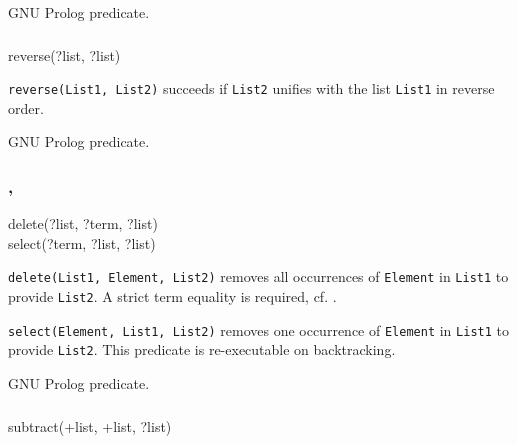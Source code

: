 \PlErrorsNone

\Portability

GNU Prolog predicate.

\subsubsection{}

\begin{TemplatesOneCol}
reverse(?list, ?list)

\end{TemplatesOneCol}

\Description

\texttt{reverse(List1, List2)} succeeds if \texttt{List2} unifies with the
list \texttt{List1} in reverse order.

\PlErrorsNone

\Portability

GNU Prolog predicate.

\subsubsection{,
  }

\begin{TemplatesOneCol}
delete(?list, ?term, ?list)\\
select(?term, ?list, ?list)

\end{TemplatesOneCol}

\Description

\texttt{delete(List1, Element, List2)} removes all occurrences of
\texttt{Element} in \texttt{List1} to provide \texttt{List2}. A strict term
equality is required, cf.  .

\texttt{select(Element, List1, List2)} removes one occurrence of
\texttt{Element} in \texttt{List1} to provide \texttt{List2}. This predicate
is re-executable on backtracking.

\PlErrorsNone

\Portability

GNU Prolog predicate.


\subsubsection{}

\begin{TemplatesOneCol}
subtract(+list, +list, ?list)
\end{TemplatesOneCol}

